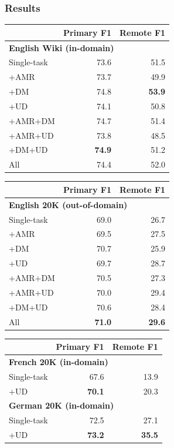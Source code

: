 \documentclass[t,xcolor={svgnames,table}]{beamer}
\begin{document}
\begin{frame}
\frametitle{Results}
\centering
\small
\setlength\tabcolsep{3pt}
\begin{tabular}{lrr}
& \footnotesize \bf Primary F1 & \footnotesize \bf Remote F1 \\
\hline
\multicolumn{3}{l}{\small \bf English Wiki (in-domain)} \\
\footnotesize Single-task
& 73.6 & 51.5 \\
\cline{1-1}
\footnotesize +AMR
& 73.7 & 49.9 \\
\footnotesize +DM
& 74.8 & \textbf{53.9} \\
\footnotesize +UD
& 74.1 & 50.8 \\
\footnotesize +AMR+DM
& 74.7 & 51.4 \\
\footnotesize +AMR+UD
& 73.8 & 48.5 \\
\footnotesize +DM+UD
& \textbf{74.9} & 51.2 \\
\footnotesize All
& 74.4 & 52.0
\end{tabular}
\hfill
\begin{tabular}{lrr}
& \footnotesize \bf Primary F1 & \footnotesize \bf Remote F1 \\
\hline
\multicolumn{3}{l}{\small \bf English 20K (out-of-domain)} \\
\footnotesize Single-task
& 69.0 & 26.7 \\
\cline{1-1}
\footnotesize +AMR
& 69.5 & 27.5 \\
\footnotesize +DM
& 70.7 & 25.9 \\
\footnotesize +UD
& 69.7 & 28.7 \\
\footnotesize +AMR+DM
& 70.5 & 27.3 \\
\footnotesize +AMR+UD
& 70.0 & 29.4 \\
\footnotesize +DM+UD
& 70.6 & 28.4 \\
\footnotesize All
& \textbf{71.0} & \textbf{29.6}
\end{tabular}
\vfill
\begin{tabular}{lrr}
& \footnotesize \bf Primary F1 & \footnotesize \bf Remote F1 \\
\hline
\multicolumn{3}{l}{\small \bf French 20K (in-domain)} \\
\small Single-task & 67.6 & 13.9 \\
\small +UD & \textbf{70.1} & 20.3 \\
\hline
\multicolumn{3}{l}{\small \bf German 20K (in-domain)} \\
\small Single-task & 72.5 & 27.1 \\
\small +UD & \textbf{73.2} & \textbf{35.5}
\end{tabular}
\end{frame}
\end{document}
